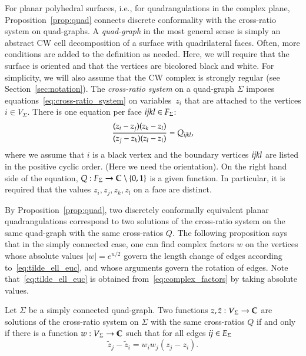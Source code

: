 \documentclass[Thesis]{subfiles}
\begin{document}
For planar polyhedral surfaces, i.e., for quadrangulations in the
complex plane, Proposition~\ref{prop:quad} connects discrete
conformality with the cross-ratio system on quad-graphs.  A
\emph{quad-graph}\/ in the most general sense is simply an abstract CW
cell decomposition of a surface with quadrilateral faces. Often, more
conditions are added to the definition as needed. Here, we will
require that the surface is oriented and that the vertices are
bicolored black and white. For simplicity, we will also assume that
the CW complex is strongly regular (see
Section~\ref{sec:notation}). The \emph{cross-ratio system} on a
quad-graph $\Sigma$ imposes equations~\eqref{eq:cross-ratio_system} on
variables~$z_{i}$ that are attached to the vertices $i\in
V_{\Sigma}$. There is one equation per face ${\it ijkl}\in F_{\Sigma}$:
\begin{equation}
  \label{eq:cross-ratio_system}
  \frac{(z_{i}-z_{j})(z_{k}-z_{l})}{(z_{j}-z_{k})(z_{l}-z_{i})}=Q_{\it
    ijkl},
\end{equation}
where we assume that  $i$ is a black vertex and the boundary
vertices $\it ijkl$ are listed in the positive cyclic order. (Here we
need the orientation). On the right hand side of the equation,
$Q:F_{\Sigma}\rightarrow\mathbb C\setminus\{0,1\}$ is a given function. In
particular, it is required that the values $z_{i},z_{j},z_{k},z_{l}$
on a face are distinct.

By Proposition~\ref{prop:quad}, two discretely conformally equivalent
planar quadrangulations correspond to two solutions of the cross-ratio
system on the same quad-graph with the same cross-ratios $Q$. The
following proposition says that in the simply connected case, one can
find complex factors $w$ on the vertices whose absolute values
$|w|=e^{u/2}$ govern the length change of edges according
to~\eqref{eq:tilde_ell_euc}, and whose arguments govern the rotation
of edges. Note that~\eqref{eq:tilde_ell_euc} is obtained
from~\eqref{eq:complex_factors} by taking absolute values.

\begin{proposition}
  \label{prop:complex_factors}
  Let $\Sigma$ be a simply connected quad-graph. Two functions
  $z,\tilde z:V_{\Sigma}\rightarrow\mathbb C$ are solutions of the
  cross-ratio system on $\Sigma$ with the same cross-ratios $Q$ if and
  only if there is a function $w:V_{\Sigma}\rightarrow \mathbb C$ such that
  for all edges ${\it ij}\in E_{\Sigma}$
  \begin{equation}
    \label{eq:complex_factors}
    \tilde z_{j}-\tilde z_{i}=w_{i}w_{j}(z_{j}-z_{i}).
  \end{equation}
\end{proposition}
\end{document}
